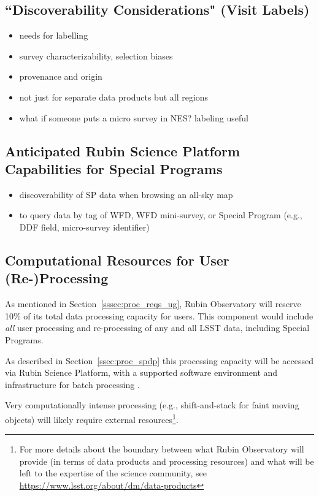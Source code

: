 \documentclass[DM,lsstdoc,toc]{lsstdoc}
\begin{document}
\subsection{``Discoverability Considerations" (Visit Labels)}

\begin{itemize}
\item needs for labelling
\item survey characterizability, selection biases
\item provenance and origin
\item not just for separate data products but all regions
\item what if someone puts a micro survey in NES? labeling useful
\end{itemize}


\subsection{Anticipated Rubin Science Platform Capabilities for Special Programs}

\begin{itemize}
\item discoverability of SP data when browsing an all-sky map
\item to query data by tag of WFD, WFD mini-survey, or Special Program (e.g., DDF field, micro-survey identifier)
\end{itemize}


\subsection{Computational Resources for User (Re-)Processing}

As mentioned in Section~\ref{sssec:proc_reqs_ug}, Rubin Observatory will reserve 10\% of its total data processing capacity for users.
This component would include {\it all} user processing and re-processing of any and all LSST data, including Special Programs. 

As described in Section~\ref{ssec:proc_spdp} this processing capacity will be accessed via Rubin Science Platform, with a supported software environment and infrastructure for batch processing .

Very computationally intense processing (e.g., shift-and-stack for faint moving objects) will likely require external resources\footnote{For more details about the boundary between what Rubin Observatory will provide (in terms of data products and processing resources) and what will be left to the expertise of the science community, see \url{https://www.lsst.org/about/dm/data-products}}.



\clearpage



\clearpage
\appendix










\end{document}

